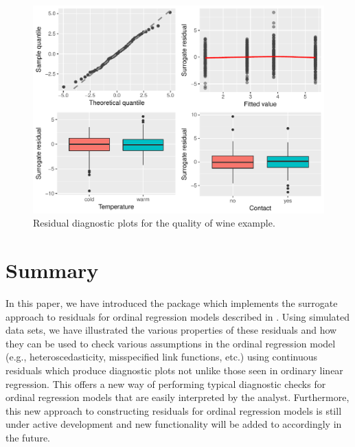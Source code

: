 \begin{figure}[!htbp]
  \centering
  \includegraphics[width=1\textwidth]{wine}
  \caption{Residual diagnostic plots for the quality of wine example.}
  \label{fig:wine}
\end{figure}



\section{Summary}

In this paper, we have introduced the  package which implements the surrogate approach to residuals for ordinal regression models described in \citet{residuals-liu-2017}. Using simulated data sets, we have illustrated the various properties of these residuals and how they can be used to check various assumptions in the ordinal regression model (e.g., heteroscedasticity, misspecified link functions, etc.) using continuous residuals which produce diagnostic plots not unlike those seen in ordinary linear regression. This offers a new way of performing typical diagnostic checks for ordinal regression models that are easily interpreted by the analyst. Furthermore, this new approach to constructing residuals for ordinal regression models is still under active development and new functionality will be added to  accordingly in the future.



